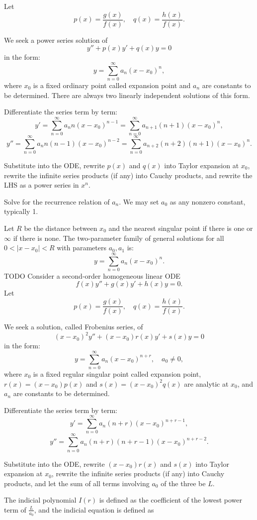 \documentclass[a4paper,12pt]{report}
\begin{document}
Let
\[p(x)=\frac{g(x)}{f(x)},\quad q(x)=\frac{h(x)}{f(x)}.\]
\ben
\item We seek a power series solution of
\[y''+p(x)y'+q(x)y=0\]
in the form:
\[y=\sum_{n=0}^{\infty}a_n(x-x_0)^n,\]
where $x_0$ is a fixed ordinary point called expansion point and $a_n$ are constants to be determined. There are always two linearly independent solutions of this form.
\item Differentiate the series term by term:
\[y'=\sum_{n=0}^{\infty}a_nn(x-x_0)^{n-1}=\sum_{n=0}^{\infty}a_{n+1}(n+1)(x-x_0)^n,\]
\[y''=\sum_{n=0}^{\infty}a_nn(n-1)(x-x_0)^{n-2}=\sum_{n=0}^{\infty}a_{n+2}(n+2)(n+1)(x-x_0)^n.\]
\item Substitute into the ODE, rewrite $p(x)$ and $q(x)$ into Taylor expansion at $x_0$, rewrite the infinite series products (if any) into Cauchy products, and rewrite the LHS as a power series in $x^n$.
\item Solve for the recurrence relation of $a_n$. We may set $a_0$ as any nonzero constant, typically 1.
\item Let $R$ be the distance between $x_0$ and the nearest singular point if there is one or $\infty$ if there is none. The two-parameter family of general solutions for all $0<|x-x_0|<R$ with parameters $a_0,a_1$ is:
\[y=\sum_{n=0}^{\infty}a_n(x-x_0)^n.\]
\een
\bpr
TODO
\epr
{}
Consider a second-order homogeneous linear ODE
\[f(x)y''+g(x)y'+h(x)y=0.\]
Let
\[p(x)=\frac{g(x)}{f(x)},\quad q(x)=\frac{h(x)}{f(x)}.\]
\ben
\item We seek a solution, called Frobenius series, of
\[(x-x_0)^2y''+(x-x_0)r(x)y'+s(x)y=0\]
in the form:
\[y=\sum_{n=0}^{\infty}a_n(x-x_0)^{n+r},\quad a_0\neq 0,\]
where $x_0$ is a fixed regular singular point called expansion point, $r(x)=(x-x_0)p(x)$ and $s(x)=(x-x_0)^2q(x)$ are analytic at $x_0$, and $a_n$ are constants to be determined.
\item Differentiate the series term by term:
\[y'=\sum_{n=0}^{\infty}a_n(n+r)(x-x_0)^{n+r-1},\]
\[y''=\sum_{n=0}^{\infty}a_n(n+r)(n+r-1)(x-x_0)^{n+r-2}.\]
\item Substitute into the ODE, rewrite $(x-x_0)r(x)$ and $s(x)$ into Taylor expansion at $x_0$, rewrite the infinite series products (if any) into Cauchy products, and let the sum of all terms involving $a_0$ of the three be $L$.
\item The indicial polynomial $I(r)$ is defined as the coefficient of the lowest power term of $\frac{L}{a_0}$, and the indicial equation is defined as
\end{document}
